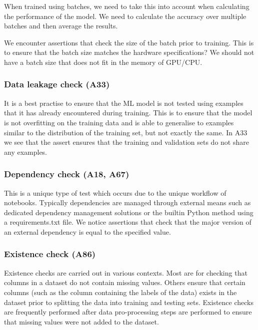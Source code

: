 When trained using batches, we need to take this into account when calculating the performance of the model. We need to calculate the accuracy over multiple batches and then average the results.

We encounter assertions that check the size of the batch prior to training. This is to ensure that the batch size matches the hardware specifications? We should not have a batch size that does not fit in the memory of GPU/CPU.


\subsubsection{Data leakage check (A33)}

It is a best practise to ensure that the ML model is not tested using examples that it has already encountered during training. This is to ensure that the model is not overfitting on the training data and is able to generalise to examples similar to the distribution of the training set, but not exactly the same. In A33 we see that the assert ensures that the training and validation sets do not share any examples.

\subsubsection{Dependency check (A18, A67)}

This is a unique type of test which occurs due to the unique workflow of notebooks. Typically dependencies are managed through external means such as dedicated dependency management solutions or the builtin Python method using a requirements.txt file. We notice assertions that check that the major version of an external dependency is equal to the specified value.


\subsubsection{Existence check (A86)}

Existence checks are carried out in various contexts. Most are for checking that columns in a dataset do not contain missing values. Others ensure that certain columns (such as the column containing the labels of the data) exists in the dataset prior to splitting the data into training and testing sets. Existence checks are frequently performed after data pro-processing  steps are performed to ensure that missing values were not added to the dataset.

